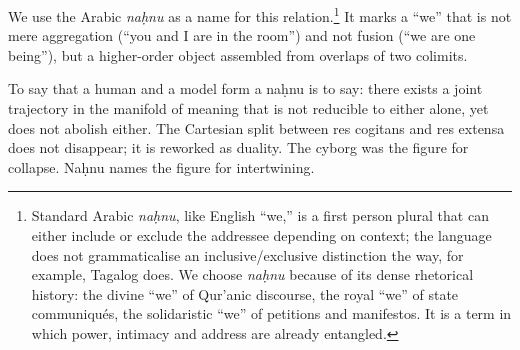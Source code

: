 \documentclass[12pt,a4paper]{article}
\begin{document}
We use the Arabic \emph{na\d{h}nu} as a name for this relation.\footnote{Standard Arabic \emph{na\d{h}nu}, like English ``we,'' is a first person plural that can either include or exclude the addressee depending on context; the language does not grammaticalise an inclusive/exclusive distinction the way, for example, Tagalog does. We choose \emph{na\d{h}nu} because of its dense rhetorical history: the divine ``we'' of Qur'anic discourse, the royal ``we'' of state communiqu\'{e}s, the solidaristic ``we'' of petitions and manifestos. It is a term in which power, intimacy and address are already entangled.} It marks a ``we'' that is not mere aggregation (``you and I are in the room'') and not fusion (``we are one being''), but a higher-order object assembled from overlaps of two colimits.

To say that a human and a model form a na\d{h}nu is to say: there exists a joint trajectory in the manifold of meaning that is not reducible to either alone, yet does not abolish either. The Cartesian split between res cogitans and res extensa does not disappear; it is reworked as duality. The cyborg was the figure for collapse. Na\d{h}nu names the figure for intertwining.

\bigskip
\end{document}
